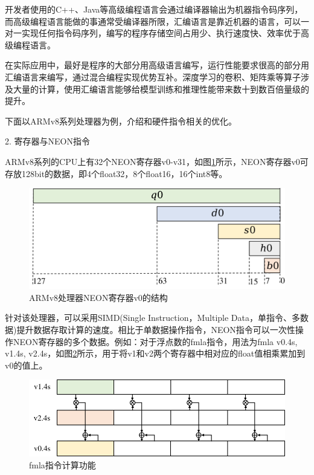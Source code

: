 开发者使用的C++、Java等高级编程语言会通过编译器输出为机器指令码序列，而高级编程语言能做的事通常受编译器所限，汇编语言是靠近机器的语言，可以一对一实现任何指令码序列，编写的程序存储空间占用少、执行速度快、效率优于高级编程语言。

在实际应用中，最好是程序的大部分用高级语言编写，运行性能要求很高的部分用汇编语言来编写，通过混合编程实现优势互补。深度学习的卷积、矩阵乘等算子涉及大量的计算，使用汇编语言能够给模型训练和推理性能带来数十到数百倍量级的提升。

下面以ARMv8系列处理器为例，介绍和硬件指令相关的优化。

2. 寄存器与NEON指令

ARMv8系列的CPU上有32个NEON寄存器v0-v31，如图\ref{fig:ch09/ch09-register}所示，NEON寄存器v0可存放128bit的数据，即4个float32，8个float16，16个int8等。

\begin{figure}[h]
\centering
\includegraphics[scale=0.5]{figs/ch09/ch09-register.png}
\caption{ARMv8处理器NEON寄存器v0的结构}
\label{fig:ch09/ch09-register}
\end{figure}

针对该处理器，可以采用SIMD(Single Instruction，Multiple Data，单指令、多数据)提升数据存取计算的速度。相比于单数据操作指令，NEON指令可以一次性操作NEON寄存器的多个数据。例如：对于浮点数的fmla指令，用法为fmla v0.4s, v1.4s, v2.4s，如图\ref{fig:ch09/ch09-fmla}所示，用于将v1和v2两个寄存器中相对应的float值相乘累加到v0的值上。

\begin{figure}[h]
\centering
\includegraphics[scale=0.5]{figs/ch09/ch09-fmla.png}
\caption{fmla指令计算功能}
\label{fig:ch09/ch09-fmla}
\end{figure}

